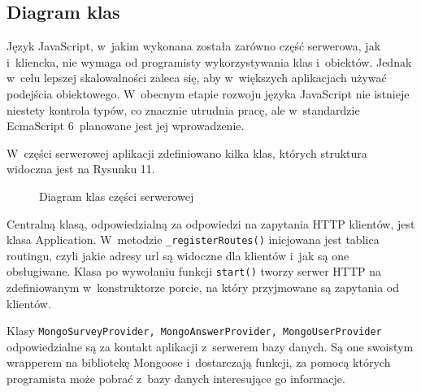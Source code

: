 \documentclass[12pt,a4paper,notitlepage]{article}
\begin{document}
\subsection{Diagram klas}
Język JavaScript, w~jakim wykonana została zarówno część serwerowa, jak i~kliencka, nie wymaga od programisty wykorzystywania klas i~obiektów. Jednak w~celu lepszej skalowalności zaleca się, aby w~większych aplikacjach używać podejścia obiektowego. W~obecnym etapie rozwoju języka JavaScript nie istnieje niestety kontrola typów, co znacznie utrudnia pracę, ale w~standardzie EcmaScript 6~planowane jest jej wprowadzenie.
\par W~części serwerowej aplikacji zdefiniowano kilka klas, których struktura widoczna jest na Rysunku 11.

\begin{figure}[H]
\begin{center}
\caption{Diagram klas części serwerowej}
\end{center}
\end{figure}

\par Centralną klasą, odpowiedzialną za odpowiedzi na zapytania HTTP klientów, jest klasa Application. W~metodzie \texttt{\_registerRoutes()} inicjowana jest tablica routingu, czyli jakie adresy url są widoczne dla klientów i~jak są one obsługiwane. Klasa po wywołaniu funkcji \texttt{start()} tworzy serwer HTTP na zdefiniowanym w~konstruktorze porcie, na który przyjmowane są zapytania od klientów.

\par Klasy \texttt{MongoSurveyProvider, MongoAnswerProvider, MongoUserProvider} odpowiedzialne są za kontakt aplikacji z~serwerem bazy danych. Są one swoistym wrapperem na bibliotekę Mongoose i~dostarczają funkcji, za pomocą których programista może pobrać z~bazy danych interesujące go informacje.
\end{document}
